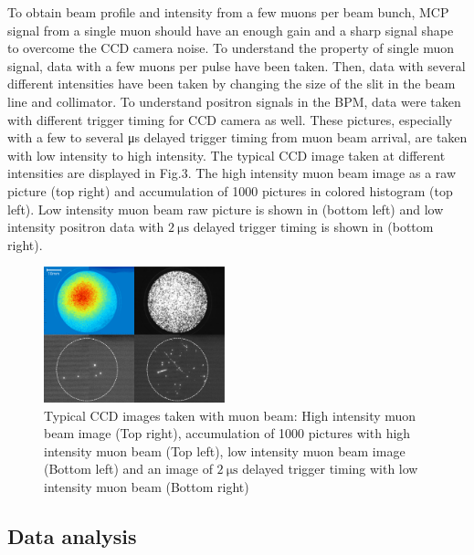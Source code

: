\documentclass[preprint,3p,twocolumn]{elsarticle}
\begin{document}
To obtain beam profile and intensity from a few muons per beam bunch, MCP signal from a single muon should have an enough gain and a sharp signal shape to overcome the CCD camera noise.
To understand the property of single muon signal, data with a few muons per pulse have been taken. Then, data with several different intensities have been taken by changing the size of the slit in the beam line and collimator. To understand positron signals in the BPM, data were taken with different trigger timing for CCD camera as well. These pictures, especially with a few to several \si{\micro\s} delayed trigger timing from muon beam arrival, are taken with low intensity to high intensity.
The typical CCD image taken at different intensities are displayed in Fig.3. The high intensity muon beam image as a raw picture (top right) and accumulation of 1000 pictures in colored histogram (top left). Low intensity muon beam raw picture is shown in (bottom left) and low intensity positron data with $\SI{2}{\micro\s}$ delayed trigger timing is shown in (bottom right).
\begin{figure}[tb]
	\begin{center}
	\includegraphics[width=0.468\textwidth, height=0.351\textwidth]{figure/fig3_v2.pdf}
	\caption{Typical CCD images taken with muon beam: High intensity muon beam image (Top right), accumulation of 1000 pictures with high intensity muon beam (Top left), low intensity muon beam image (Bottom left) and an image of $\SI{2}{\micro\s}$ delayed trigger timing with low intensity muon beam (Bottom right)
	}
	\end{center}
	\vspace{-0.4cm}
	\label{fig:single_cluster}
\end{figure}
\subsection{Data analysis}
\end{document}
